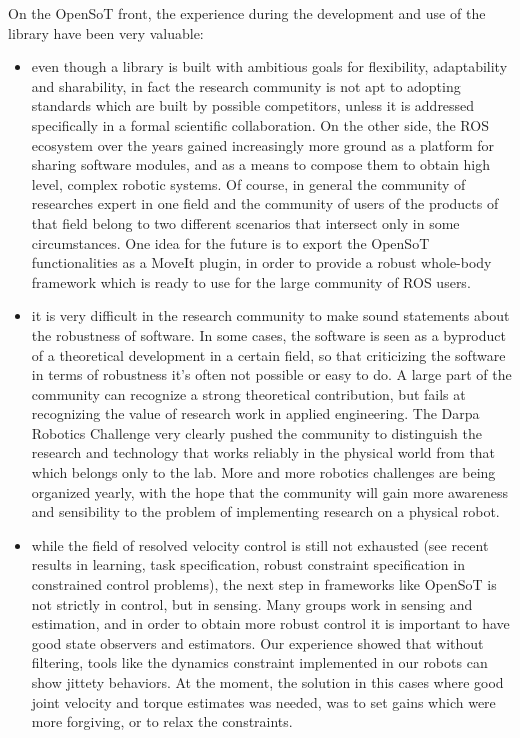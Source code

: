 \documentclass[%
	paper=A4,					%
	twoside=true,				%
	openright,			.
	parskip=full,				%
	chapterprefix=true,			%
	11pt,						%
	headings=normal,			%
	bibliography=totoc,			%
	listof=totoc,				%
	titlepage=on,				%
	captions=tableabove,		%
	draft=false,				%
]{scrreprt}%
\begin{document}
On the OpenSoT front, the experience during the development and use of the library have been very valuable:
\begin{itemize}
 \item even though a library is built with ambitious goals for flexibility, adaptability and sharability, in fact the research community is not apt to adopting standards which are built by possible competitors, unless it is addressed specifically in a formal scientific collaboration. On the other side, the ROS ecosystem over the years gained increasingly more ground as a platform for sharing software modules, and as a means to compose them to obtain high level, complex robotic systems. Of course, in general the community of researches expert in one field and the community of users of the products of that field belong to two different scenarios that intersect only in some circumstances. One idea for the future is to export the OpenSoT functionalities as a MoveIt plugin, in order to provide a robust whole-body framework which is ready to use for the large community of ROS users.
 \item it is very difficult in the research community to make sound statements about the robustness of software. In some cases, the software is seen as a byproduct of a theoretical development in a certain field, so that criticizing the software in terms of robustness it's often not possible or easy to do. A large part of the community can recognize a strong theoretical contribution, but fails at recognizing the value of research work in applied engineering. The Darpa Robotics Challenge very clearly pushed the community to distinguish the research and technology that works reliably in the physical world from that which belongs only to the lab. More and more robotics challenges are being organized yearly, with the hope that the community will gain more awareness and sensibility to the problem of implementing research on a physical robot.
 \item while the field of resolved velocity control is still not exhausted (see recent results in learning, task specification, robust constraint specification \cite{del2015robustness} in constrained control problems), the next step in frameworks like OpenSoT is not strictly in control, but in sensing. Many groups work in sensing and estimation, and in order to obtain more robust control it is important to have good state observers and estimators. Our experience showed that without filtering, tools like the dynamics constraint implemented in our robots can show jittety behaviors. At the moment, the solution in this cases where good joint velocity and torque estimates was needed, was to set gains which were more forgiving, or to relax the constraints.

\end{itemize}
\end{document}
